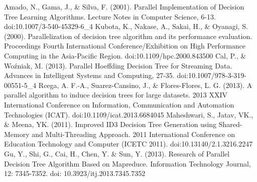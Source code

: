 \documentclass[12pt]{article}
\begin{document}
\begin{thebibliography}{20}
     Amado, N., Gama, J., \& Silva, F. (2001). Parallel Implementation of Decision Tree Learning Algorithms. Lecture Notes in Computer Science, 6-13. doi:10.1007/3-540-45329-6\_4 
     Kubota, K., Nakase, A., Sakai, H., \& Oyanagi, S. (2000). Parallelization of decision tree algorithm and its performance evaluation. Proceedings Fourth International Conference/Exhibition on High Performance Computing in the Asia-Pacific Region. doi:10.1109/hpc.2000.843500
     Cal, P., \& Woźniak, M. (2013). Parallel Hoeffding Decision Tree for Streaming Data. Advances in Intelligent Systems and Computing, 27-35. doi:10.1007/978-3-319-00551-5\_4
     Rcega, A. F.-A., Suarez-Cansino, J., \& Flores-Flores, L. G. (2013). A parallel algorithm to induce decision trees for large datasets. 2013 XXIV International Conference on Information, Communication and Automation Technologies (ICAT). doi:10.1109/icat.2013.6684045 
     Maheshwari, S., Jatav, VK., \& Meena, YK. (2011). Improved ID3 Decision Tree Generation using Shared-Memory and Multi-Threading Approach. 2011 International Conference on Education Technology and Computer (ICETC 2011). doi:10.13140/2.1.3216.2247
     Gu, Y., Shi, G., Cai, H., Chen, Y. \& Sun, Y. (2013). Research of Parallel Decision Tree Algorithm Based on Mapreduce. Information Technology Journal, 12: 7345-7352. doi: 10.3923/itj.2013.7345.7352

\end{thebibliography}
\end{document}

